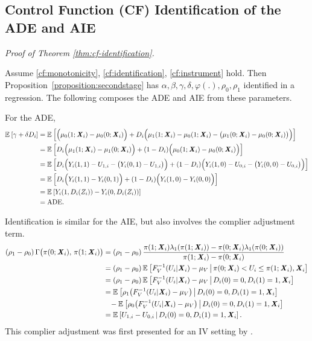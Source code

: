 \subsection{Control Function (CF) Identification of the ADE and AIE}
\label{appendix:cf-ade-aie}
\textit{Proof of Theorem \ref{thm:cf-identification}.}

Assume \ref{cf:monotonicity}, \ref{cf:identification}, \ref{cf:instrument} hold.
Then Proposition~\ref{proposition:secondstage} has $\alpha, \beta, \gamma, \delta, \varphi(.), \rho_0, \rho_1$ identified in a regression.
The following composes the ADE and AIE from these parameters.

For the ADE,
\begin{align*}
    \mathbb{E}_{} \left[  \gamma + \delta D_i \right]
        &= \mathbb{E}_{} \left[  \Big( \mu_0(1; \boldsymbol{\mathit{X}}_i) - \mu_0(0; \boldsymbol{\mathit{X}}_i) \Big)
            + D_i \Big( \mu_1(1; \boldsymbol{\mathit{X}}_i) - \mu_0(1; \boldsymbol{\mathit{X}}_i) - \big( \mu_1(0; \boldsymbol{\mathit{X}}_i) - \mu_0(0; \boldsymbol{\mathit{X}}_i) \big) \Big)  \right] \\
    &= \mathbb{E}_{} \left[  D_i \Big(\mu_1(1; \boldsymbol{\mathit{X}}_i) - \mu_1(0; \boldsymbol{\mathit{X}}_i) \Big)
        + (1 - D_i) \Big( \mu_0(1; \boldsymbol{\mathit{X}}_i) - \mu_0(0; \boldsymbol{\mathit{X}}_i) \Big)  \right] \\
    &= \mathbb{E}_{} \left[  D_i \Big( Y_i(1,1) - U_{1,i} - \big( Y_i(0,1) - U_{1,i} \big) \Big)
        + (1 - D_i) \Big( 
            Y_i(1,0) - U_{0,i} - \big( Y_i(0,0) - U_{0,i} \big) \Big)  \right] \\
    &= \mathbb{E}_{} \left[  D_i \Big( Y_i(1,1) - Y_i(0,1) \Big)
        + (1 - D_i) \Big( Y_i(1,0) - Y_i(0,0) \Big)  \right] \\
    &= \mathbb{E}_{} \left[  Y_i(1, D_i(Z_i)) - Y_i(0, D_i(Z_i)) \right] \\
    &= \text{ADE}.
\end{align*}

Identification is similar for the AIE, but also involves the complier adjustment term.
\begin{align*}
    (\rho_1 - \rho_0) \, \Gamma \big(\pi(0; \boldsymbol{\mathit{X}}_i), \, \pi(1; \boldsymbol{\mathit{X}}_i) \big)
    &= (\rho_1 - \rho_0) \, \frac{\pi(1; \boldsymbol{\mathit{X}}_i)\lambda_1(\pi(1; \boldsymbol{\mathit{X}}_i)) - \pi(0; \boldsymbol{\mathit{X}}_i)\lambda_1(\pi(0; \boldsymbol{\mathit{X}}_i))}{\pi(1; \boldsymbol{\mathit{X}}_i) - \pi(0; \boldsymbol{\mathit{X}}_i)} \\
    &= (\rho_1 - \rho_0) \, \mathbb{E}_{} \left[  F_V^{-1}(U_i | \boldsymbol{\mathit{X}}_i) - \mu_V  \, \middle\vert \, \pi(0; \boldsymbol{\mathit{X}}_i) < U_i \leq \pi(1; \boldsymbol{\mathit{X}}_i), \boldsymbol{\mathit{X}}_i \right] \\
    &= (\rho_1 - \rho_0) \, \mathbb{E}_{} \left[  F_V^{-1}(U_i | \boldsymbol{\mathit{X}}_i) - \mu_V  \, \middle\vert \, 
        D_i(0) = 0, D_i(1) = 1, \boldsymbol{\mathit{X}}_i \right] \\
    &= \mathbb{E}_{} \left[  \rho_1 \big( F_V^{-1}(U_i | \boldsymbol{\mathit{X}}_i) - \mu_V \big)  \, \middle\vert \, 
        D_i(0) = 0, D_i(1) = 1, \boldsymbol{\mathit{X}}_i \right] \\
    &\;\;\; - \mathbb{E}_{} \left[  \rho_0 \big( F_V^{-1}(U_i | \boldsymbol{\mathit{X}}_i) - \mu_V \big)  \, \middle\vert \, 
        D_i(0) = 0, D_i(1) = 1, \boldsymbol{\mathit{X}}_i \right] \\
    &= \mathbb{E}_{} \left[  U_{1,i} - U_{0,i}  \, \middle\vert \, D_i(0) = 0, D_i(1) = 1, \boldsymbol{\mathit{X}}_i \right].
\end{align*}
This complier adjustment was first presented for an IV setting by \cite{kline2019heckits}.

